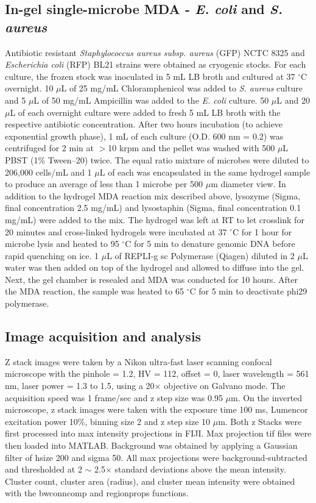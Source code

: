 \subsection{In-gel single-microbe MDA - \textit{E. coli}  and \textit{S. aureus} }
Antibiotic resistant \textit{Staphylococcus aureus subsp. aureus} (GFP) NCTC 8325 and \textit{Escherichia coli} (RFP) BL21 strains were obtained as cryogenic stocks. For each culture, the frozen stock was inoculated in 5 mL LB broth and cultured at 37 $^{\circ}$C overnight. 10 $\mu$L of 25 mg\slash mL Chloramphenicol was added to \textit{S. aureus}  culture and 5 $\mu$L of 50 mg\slash mL Ampicillin was added to the \textit{E. coli}  culture. 50 $\mu$L and 20 $\mu$L of each overnight culture were added to fresh 5 mL LB broth with the respective antibiotic concentration. After two hours incubation (to achieve exponential growth phase), 1 mL of each culture (O.D. 600 nm = 0.2) was centrifuged for 2 min at $>$10 krpm and the pellet was washed with 500 $\mu$L PBST (1\% Tween--20) twice. The equal ratio mixture of microbes were diluted to 206,000 cells\slash mL and 1 $\mu$L of each was encapsulated in the same hydrogel sample to produce an average of less than 1 microbe per 500 $\mu$m diameter view. In addition to the hydrogel MDA reaction mix described above, lysozyme (Sigma, final concentration 2.5 mg\slash mL) and lysostaphin (Sigma, final concentration 0.1 mg\slash mL) were added to the mix. The hydrogel was left at RT to let crosslink for 20 minutes and cross-linked hydrogels were incubated at 37 $^{\circ}$C for 1 hour for microbe lysis and heated to 95 $^{\circ}$C for 5 min to denature genomic DNA before rapid quenching on ice. 1 $\mu$L of REPLI-g sc Polymerase (Qiagen) diluted in 2 $\mu$L water was then added on top of the hydrogel and allowed to diffuse into the gel. Next, the gel chamber is resealed and MDA was conducted for 10 hours. After the MDA reaction, the sample was heated to 65 $^{\circ}$C for 5 min to deactivate phi29 polymerase.

\subsection{Image acquisition and analysis}
Z stack images were taken by a Nikon ultra-fast laser scanning confocal microscope with the pinhole = 1.2, HV = 112, offset = 0, laser wavelength = 561 nm, laser power = 1.3 to 1.5, using a 20$\times$ objective on Galvano mode. The acquisition speed was 1 frame\slash sec and z step size was 0.95 $\mu$m. On the inverted microscope, z stack images were taken with the exposure time 100 ms, Lumencor excitation power 10\%, binning size 2 and z step size 10 $\mu$m. Both z Stacks were first processed into max intensity projections in FIJI. Max projection tif files were then loaded into MATLAB. Background was obtained by applying a Gaussian filter of hsize 200 and sigma 50. All max projections were background-subtracted and thresholded at 2 $\sim$ 2.5$\times$ standard deviations above the mean intensity. Cluster count, cluster area (radius), and cluster mean intensity were obtained with the bwconncomp and regionprops functions.

